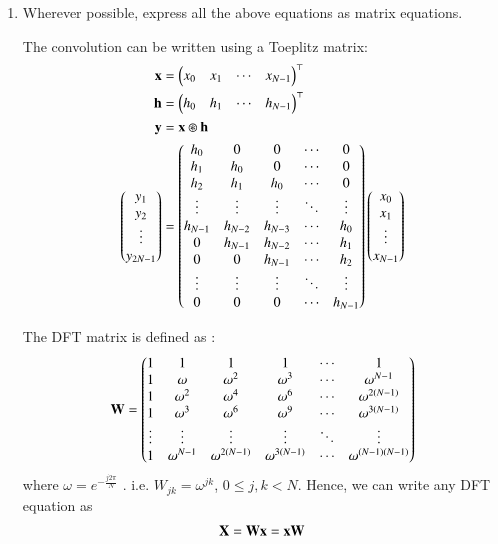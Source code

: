 \documentclass[journal,12pt,twocolumn]{IEEEtran}
\theoremstyle{remark}
\renewcommand\thesection{\arabic{section}}
\numberwithin{equation}{subsection}
\begin{document}
\begin{enumerate}[label=\thesection.\arabic*]
\item Wherever possible, express all the above equations as matrix equations.\\
\solution 
	
	The convolution can be written using a Toeplitz matrix:
\begin{align}
		\mathbf{x} &= \begin{pmatrix}x_0 & x_1	 & \cdots & x_{N-1}\end{pmatrix}^\top \\
		\mathbf{h} &= \begin{pmatrix}h_0 & h_1	 & \cdots & h_{N-1}\end{pmatrix}^\top \\
		\mathbf{y} &= \mathbf{x} \circledast \mathbf{h} \\
		\begin{pmatrix}y_1 \\ y_2 \\ \vdots \\ y_{2N - 1}\end{pmatrix} &= \begin{pmatrix}
			h_0 & 0 & 0 & \cdots & 0 \\
			h_1 & h_0 & 0 & \cdots & 0 \\
			h_2 & h_1 & h_0 & \cdots & 0 \\
			\vdots & \vdots & \vdots & \ddots & \vdots \\
			h_{N-1} & h_{N-2} & h_{N-3} & \cdots & h_0 \\
			0 & h_{N-1} & h_{N-2} & \cdots & h_1 \\
			0 & 0 & h_{N-1} & \cdots & h_2 \\
			\vdots & \vdots & \vdots & \ddots & \vdots \\
			0 & 0 & 0 & \cdots & h_{N-1}
		\end{pmatrix}		
		\begin{pmatrix}x_0\\x_1\\ \vdots \\x_{N-1}\end{pmatrix}
	\end{align}

	
The DFT matrix is defined as : 
	\begin{align}
		\mathbf{W} = \begin{pmatrix}
			1 & 1 & 1 & 1 & \cdots & 1 \\
			1 & \omega & \omega^2 & \omega^3 & \cdots & \omega^{N-1} \\
			1 & \omega^2 & \omega^4 & \omega^6 & \cdots & \omega^{2(N-1)} \\
			1 & \omega^3 & \omega^6 & \omega^9 & \cdots & \omega^{3(N-1)} \\
			\vdots & \vdots & \vdots & \vdots & \ddots & \vdots \\ 
			1 & \omega^{N-1} & \omega^{2(N-1)} & \omega^{3(N-1)} & \cdots & \omega^{(N-1)(N-1)}
		\end{pmatrix}
	\end{align}
where $\omega=e^{-\frac{j2\pi}{N}}$ . i.e. $W_{jk} = \omega^{jk}$, $0 \leq j, k < N$. Hence, we can write any DFT equation as
\begin{align}
	\mathbf{X} = \mathbf{W}\mathbf{x} = \mathbf{x}\mathbf{W}
\end{align}


\end{enumerate}
\end{document}
